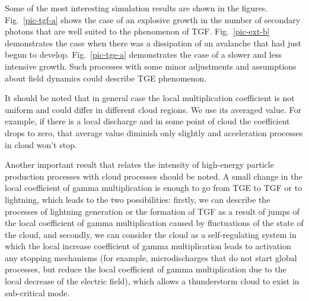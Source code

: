 \documentclass[%
 aip,
cp,  %
 amsmath,amssymb,%
 reprint,%
]{revtex4-2}
\begin{document}
Some of the most interesting simulation results are shown in the figures. Fig.~\ref{pic-tgf-a} shows the case of an explosive growth in the number of secondary photons that are well suited to the phenomenon of TGF. Fig.~\ref{pic-ext-b}  demonstrates the case when there was a dissipation of an avalanche that had just begun to develop. Fig.~\ref{pic-tge-a}  demonstrates the case of a slower and less intensive growth. Such processes with some minor adjustments and assumptions about field dynamics could describe TGE phenomenon.

It should be noted that in general case the local multiplication coefficient is not uniform and could differ in different cloud regions. We use its averaged value. For example, if there is a local discharge and in some point of cloud the coefficient drops to zero, that average value diminish only slightly and acceleration processes in cloud won't stop.

Another important result that relates the intensity of high-energy particle production processes with cloud processes should be noted. A small change in the local coefficient of gamma multiplication is enough to go from TGE to TGF or to lightning, which leads to the two possibilities: firstly, we can describe the processes of lightning generation or the formation of TGF as a result of jumps of the local coefficient of gamma multiplication caused by fluctuations of the state of the cloud, and secondly, we can consider the cloud as a self-regulating system in which the local increase coefficient of gamma multiplication leads to activation any stopping mechanisms (for example, microdischarges that do not start global processes, but reduce the local coefficient of gamma multiplication due to the local decrease of the electric field), which allows a thunderstorm cloud to exist in sub-critical mode.
\end{document}
